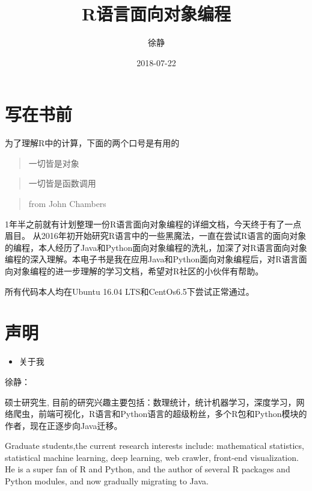 \documentclass[]{book}
\title{R语言面向对象编程}
\author{徐静}
\date{2018-07-22}
\providecommand{\tightlist}{%
  \setlength{\itemsep}{0pt}\setlength{\parskip}{0pt}}
\begin{document}
\maketitle

{
\setcounter{tocdepth}{1}
\tableofcontents
}
\chapter*{写在书前}

为了理解R中的计算，下面的两个口号是有用的

\begin{quote}
一切皆是对象
\end{quote}

\begin{quote}
一切皆是函数调用
\end{quote}

\begin{quote}
from John Chambers
\end{quote}

1年半之前就有计划整理一份R语言面向对象编程的详细文档，今天终于有了一点眉目。
从2016年初开始研究R语言中的一些黑魔法，一直在尝试R语言的面向对象的编程，本人经历了Java和Python面向对象编程的洗礼，加深了对R语言面向对象编程的深入理解。本电子书是我在应用Java和Python面向对象编程后，对R语言面向对象编程的进一步理解的学习文档，希望对R社区的小伙伴有帮助。

所有代码本人均在Ubuntu 16.04 LTS和CentOs6.5下尝试正常通过。

\chapter*{声明}

\begin{itemize}
\tightlist
\item
  关于我
\end{itemize}

徐静：

硕士研究生,
目前的研究兴趣主要包括：数理统计，统计机器学习，深度学习，网络爬虫，前端可视化，R语言和Python语言的超级粉丝，多个R包和Python模块的作者，现在正逐步向Java迁移。

Graduate students,the current research interests include: mathematical
statistics, statistical machine learning, deep learning, web crawler,
front-end visualization. He is a super fan of R and Python, and the
author of several R packages and Python modules, and now gradually
migrating to Java.
\end{document}
